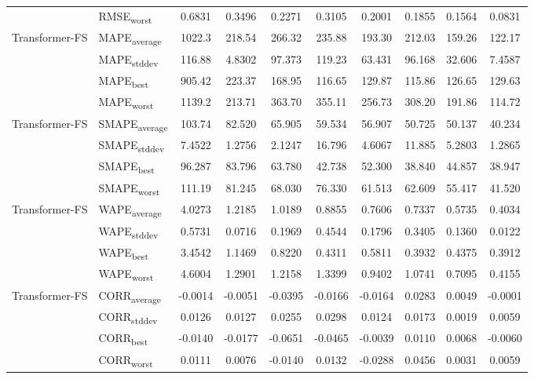 {\begin{longtable}{l l c c c c c c c c}
 & RMSE\textsubscript{worst} & 0.6831 & 0.3496 & 0.2271 & 0.3105 & 0.2001 & 0.1855 & 0.1564 & 0.0831 \\
\cmidrule(lr){2-10}
\multirow{4}{*}{Transformer-FS} & MAPE\textsubscript{average} & 1022.3 & 218.54 & 266.32 & 235.88 & 193.30 & 212.03 & 159.26 & 122.17 \\
 & MAPE\textsubscript{stddev} & 116.88 & 4.8302 & 97.373 & 119.23 & 63.431 & 96.168 & 32.606 & 7.4587 \\
 & MAPE\textsubscript{best} & 905.42 & 223.37 & 168.95 & 116.65 & 129.87 & 115.86 & 126.65 & 129.63 \\
 & MAPE\textsubscript{worst} & 1139.2 & 213.71 & 363.70 & 355.11 & 256.73 & 308.20 & 191.86 & 114.72 \\
\cmidrule(lr){2-10}
\multirow{4}{*}{Transformer-FS} & SMAPE\textsubscript{average} & 103.74 & 82.520 & 65.905 & 59.534 & 56.907 & 50.725 & 50.137 & 40.234 \\
 & SMAPE\textsubscript{stddev} & 7.4522 & 1.2756 & 2.1247 & 16.796 & 4.6067 & 11.885 & 5.2803 & 1.2865 \\
 & SMAPE\textsubscript{best} & 96.287 & 83.796 & 63.780 & 42.738 & 52.300 & 38.840 & 44.857 & 38.947 \\
 & SMAPE\textsubscript{worst} & 111.19 & 81.245 & 68.030 & 76.330 & 61.513 & 62.609 & 55.417 & 41.520 \\
\cmidrule(lr){2-10}
\multirow{4}{*}{Transformer-FS} & WAPE\textsubscript{average} & 4.0273 & 1.2185 & 1.0189 & 0.8855 & 0.7606 & 0.7337 & 0.5735 & 0.4034 \\
 & WAPE\textsubscript{stddev} & 0.5731 & 0.0716 & 0.1969 & 0.4544 & 0.1796 & 0.3405 & 0.1360 & 0.0122 \\
 & WAPE\textsubscript{best} & 3.4542 & 1.1469 & 0.8220 & 0.4311 & 0.5811 & 0.3932 & 0.4375 & 0.3912 \\
 & WAPE\textsubscript{worst} & 4.6004 & 1.2901 & 1.2158 & 1.3399 & 0.9402 & 1.0741 & 0.7095 & 0.4155 \\
\cmidrule(lr){2-10}
\multirow{4}{*}{Transformer-FS} & CORR\textsubscript{average} & -0.0014 & -0.0051 & -0.0395 & -0.0166 & -0.0164 & 0.0283 & 0.0049 & -0.0001 \\
 & CORR\textsubscript{stddev} & 0.0126 & 0.0127 & 0.0255 & 0.0298 & 0.0124 & 0.0173 & 0.0019 & 0.0059 \\
 & CORR\textsubscript{best} & -0.0140 & -0.0177 & -0.0651 & -0.0465 & -0.0039 & 0.0110 & 0.0068 & -0.0060 \\
 & CORR\textsubscript{worst} & 0.0111 & 0.0076 & -0.0140 & 0.0132 & -0.0288 & 0.0456 & 0.0031 & 0.0059 \\

\end{longtable}}
